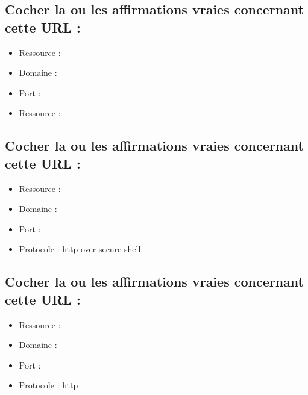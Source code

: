 \documentclass[11pt,a4paper]{article}
\begin{document}
\subsection{Cocher la ou les affirmations vraies concernant cette URL :}


\bigskip

\begin{itemize}
\item[\CaseCoche] Ressource :  \\  %
\item[\CaseCoche] Domaine :  \\  %
\item[\CaseCoche] Port :  \\
\item[\CaseCoche] Ressource :  \\
\end{itemize}


\subsection{Cocher la ou les affirmations vraies concernant cette URL :}


\bigskip

\begin{itemize}
\item[\CaseCoche] Ressource :  \\
\item[\CaseCoche] Domaine :  \\  %
\item[\CaseCoche] Port :  \\
\item[\CaseCoche] Protocole : http over secure shell \\
\end{itemize}


\subsection{Cocher la ou les affirmations vraies concernant cette URL :}


\bigskip

\begin{itemize}
\item[\CaseCoche] Ressource :  \\
\item[\CaseCoche] Domaine :  \\  %
\item[\CaseCoche] Port :  \\
\item[\CaseCoche] Protocole : http\\
\end{itemize}
\end{document}
